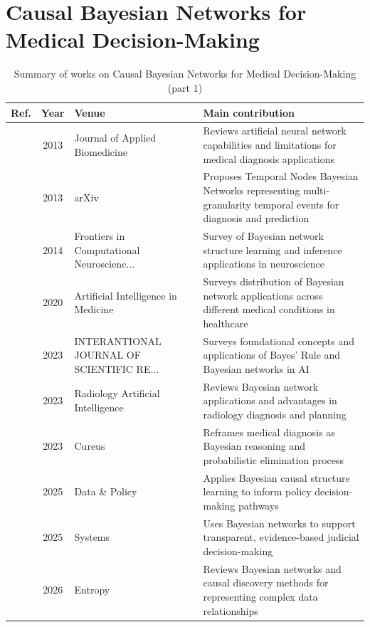 \section{Causal Bayesian Networks for Medical Decision-Making}\label{sec:theme2}
\begin{table}[!t]
\centering
\renewcommand{\arraystretch}{1.2}
\caption{Summary of works on Causal Bayesian Networks for Medical Decision-Making (part 1)}\label{tab:theme2}
\begin{tabularx}{\textwidth}{@{}l c p{3.6cm} X@{}}
\toprule
\textbf{Ref.} & \textbf{Year} & \textbf{Venue} & \textbf{Main contribution} \\
\midrule
\cite{amato2013artificial} & 2013 & Journal of Applied Biomedicine & Reviews artificial neural network capabilities and limitations for medical diagnosis applications \\
\cite{figueroa2013temporal} & 2013 & arXiv & Proposes Temporal Nodes Bayesian Networks representing multi-granularity temporal events for diagnosis and prediction \\
\cite{bielza2014bayesian} & 2014 & Frontiers in Computational Neuroscienc... & Survey of Bayesian network structure learning and inference applications in neuroscience \\
\cite{mclachlan2020bayesian} & 2020 & Artificial Intelligence in Medicine & Surveys distribution of Bayesian network applications across different medical conditions in healthcare \\
\cite{geetha2023understanding} & 2023 & INTERANTIONAL JOURNAL OF SCIENTIFIC RE... & Surveys foundational concepts and applications of Bayes' Rule and Bayesian networks in AI \\
\cite{ma2023bayesian} & 2023 & Radiology Artificial Intelligence & Reviews Bayesian network applications and advantages in radiology diagnosis and planning \\
\cite{rao2023medical} & 2023 & Cureus & Reframes medical diagnosis as Bayesian reasoning and probabilistic elimination process \\
\cite{moreira2025bayesian} & 2025 & Data \& Policy & Applies Bayesian causal structure learning to inform policy decision-making pathways \\
\cite{moric2025based} & 2025 & Systems & Uses Bayesian networks to support transparent, evidence-based judicial decision-making \\
\cite{gao2026bayesian} & 2026 & Entropy & Reviews Bayesian networks and causal discovery methods for representing complex data relationships \\

\end{tabularx}
\end{table}
